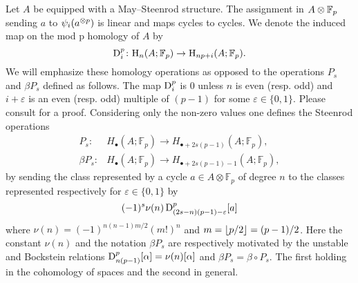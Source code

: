 Let $A$ be equipped with a May--Steenrod structure.
The assignment in $A \otimes {\mathbb{F}_p}$ sending $a$ to $\psi_i(a^{\otimes p})$ is linear and maps cycles to cycles.
We denote the induced map on the mod p homology of $A$ by
\[
\mathrm{D}_i^p \colon \mathrm{H}_n(A; {\mathbb{F}_p}) \to \mathrm{H}_{np+i}(A; {\mathbb{F}_p}).
\]
We will emphasize these homology operations as opposed to the operations $P_s$ and $\beta P_s$ defined as follows.
The map $\mathrm{D}_i^p$ is $0$ unless $n$ is even (resp. odd) and $i+\varepsilon$ is an even (resp. odd) multiple of $(p-1)$ for some $\varepsilon \in \{0,1\}$.
Please consult \cite[Proposition 2.3. (iv)]{may1970general} for a proof.
Considering only the non-zero values one defines the Steenrod operations
\begin{align*}
	P_s \colon& H_\bullet(A; \mathbb{F}_p) \to H_{\bullet + 2s(p-1)}(A; \mathbb{F}_p), \\
	\beta P_s \colon& H_\bullet(A; \mathbb{F}_p) \to H_{\bullet + 2s(p-1) - 1}(A; \mathbb{F}_p),
\end{align*}
by sending the class represented by a cycle $a \in A \otimes \mathbb{F}_p$ of degree $n$ to the classes represented respectively for $\varepsilon \in \{0,1\}$ by
\begin{equation*}
	(-1)^s \nu(n) \, \mathrm{D}^p_{(2s-n)(p-1)-\varepsilon}[a]
\end{equation*}
where $\nu(n) = (-1)^{n(n-1)m/2}(m!)^n$ and $m = \lfloor p/2\rfloor = (p-1)/2$.
Here the constant $\nu(n)$ and the notation $\beta P_s$ are respectively motivated by the unstable and Bockstein relations $\mathrm{D}_{n(p-1)}^p[\alpha] = \nu(n)[\alpha]$ and $\beta P_s = \beta \circ P_s$.
The first holding in the cohomology of spaces and the second in general.